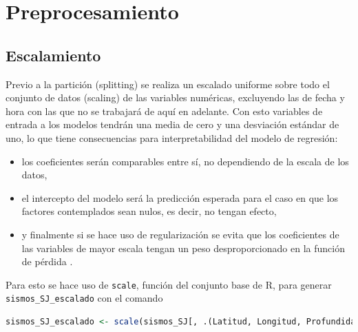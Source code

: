 \documentclass[a4paper]{report}
\begin{document}





\section{Preprocesamiento}


\subsection{Escalamiento}\label{sec:escalamiento}
Previo a la partición (splitting) se realiza un escalado uniforme sobre todo el conjunto de datos (scaling) de las variables numéricas, excluyendo las de fecha y hora con las que no se trabajará de aquí en adelante.
Con esto variables de entrada a los modelos tendrán una media de cero y una desviación estándar de uno, lo que tiene consecuencias para interpretabilidad del modelo de regresión:
\begin{itemize}
	\item los coeficientes serán comparables entre sí, no dependiendo de la escala de los datos,
	\item el intercepto del modelo será la predicción esperada para el caso en que los factores contemplados sean nulos, es decir, no tengan efecto,
	\item y finalmente si se hace uso de regularización se evita que los coeficientes de las variables de mayor escala tengan un peso desproporcionado en la función de pérdida \cite[sección 3.4.1]{hastie_elements_2009}.
\end{itemize}
Para esto se hace uso de \lstinline[language = R]'scale', función del conjunto base de R, para generar \lstinline[language = R]'sismos_SJ_escalado' con el comando
\begin{lstlisting}[breaklines=true, language=R]
sismos_SJ_escalado <- scale(sismos_SJ[, .(Latitud, Longitud, Profundidad, Magnitud, `Proxy amplitud`, `Proxy energía`)])
\end{lstlisting} 
\end{document}
